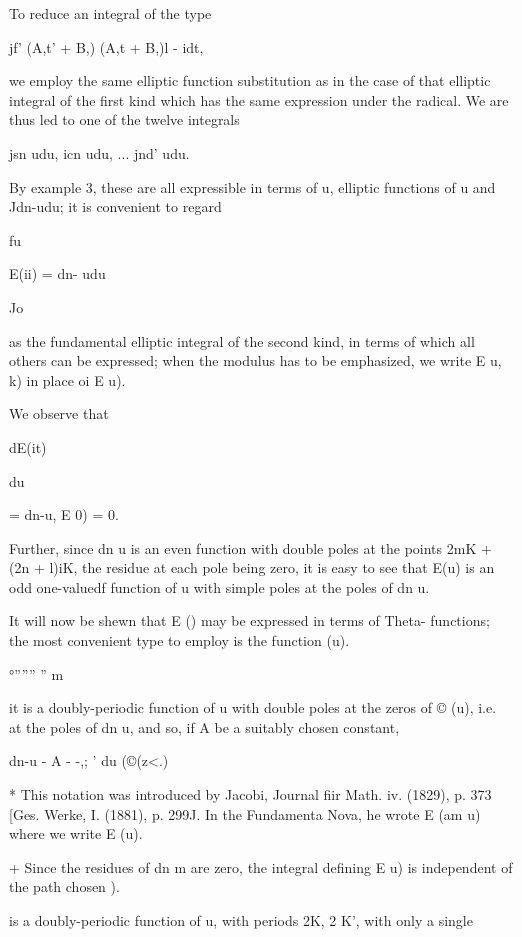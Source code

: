To reduce an integral of the type

jf' (A,t' + B,) (A,t + B,)l - idt,

we employ the same elliptic function substitution as in the case of
that elliptic integral of the first kind which has the same expression
under the radical. We are thus led to one of the twelve integrals

jsn udu, icn udu, ... jnd' udu.

By example 3, these are all expressible in terms of u,
elliptic functions of u and Jdn-udu; it is convenient to regard

fu

E(ii) = dn- udu

Jo

as the fundamental elliptic integral of the second kind, in terms of
which all others can be expressed; when the modulus has to be
emphasized, we write E u, k) in place oi E u).

We observe that

dE(it)

du

= dn-u, E 0) = 0.

Further, since dn u is an even function with double poles at the
points 2mK + (2n + l)iK, the residue at each pole being zero, it is
easy to see that E(u) is an odd one-valuedf function of u with simple
poles at the poles of dn u.

It will now be shewn that E () may be expressed in terms of Theta-
functions; the most convenient type to employ is the function (u).

 °'''''' '' m %

it is a doubly-periodic function of u with double poles at the zeros
of © (u), i.e. at the poles of dn u, and so, if A be a suitably chosen
constant,

dn-u - A - -,; ' du (©(z<.)

* This notation was introduced by Jacobi, Journal fiir Math. iv.
(1829), p. 373 [Ges. Werke, I. (1881), p. 299J. In the Fundamenta
Nova, he wrote E (am u) where we write E (u).

+ Since the residues of dn m are zero, the integral defining E u) is
independent of the path chosen ).

%
%

is a doubly-periodic function of u, with periods 2K, 2 K', with only a
single

